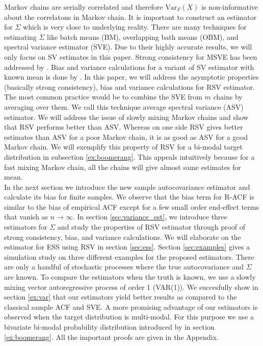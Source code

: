 \documentclass[12pt]{article}
\newcommand{\Var}{\text{Var}}
\begin{document}
Markov chains are serially correlated and therefore $\Var_F(X)$ is non-informative about the correlatons in Markov chain. It is important to construct an estimator for $\Sigma$ which is very close to underlying reality. There are many techniques for estimating $\Sigma$ like batch means (BM), overlapping bath means (OBM), and spectral variance estimator (SVE). Due to their highly accurate results, we will only focus on SV estimates in this paper. Strong consistency for MSVE has been addressed by \cite{vats:fleg:jon:2018}. Bias and variance calculations for a variant of SV estimator with known mean is done by \cite{hannan2009multiple}. In this paper, we will address the asymptotic properties (basically strong consistency), bias and variance calculations for RSV estimator. \\

The most common practice would be to combine the SVE from $m$ chains by averaging over them. We call this technique average spectral variance (ASV) estimator. We will address the issue of slowly mixing Markov chains and show that RSV performs better than ASV. Whereas on one side RSV gives better estimates than ASV for a poor Markov chain, it is as good as ASV for a good Markov chain. We will exemplify this property of RSV for a bi-modal target distribution in subsection \ref{ex:boomerang}. This appeals intuitively because for a fast mixing Markov chain, all the chains will give almost same estimates for mean. \\

In the next section we introduce the new sample autocovariance estimator and calculate its bias for finite samples. We observe that the bias term for R-ACF is similar to the bias of empirical ACF except for a few small order end-effect terms that vanish as $n \to \infty$. In section \ref{sec:variance_est}, we introduce three estimators for $\Sigma$ and study the properties of RSV estimator through proof of strong consistency, bias, and variance calculations. We will elaborate on the estimator for ESS using RSV in section \ref{sec:ess}. Section \ref{sec:examples} gives a simulation study on three different examples for the proposed estimators. There are only a handful of stochastic processes where the true autocovariance and $\Sigma$ are known. To compare the estimators when the truth is known, we use a slowly mixing vector autoregressive process of order 1 (VAR(1)). We succesfully show in section \ref{ex:var} that our estimators yield better results as compared to the classical sample ACF and SVE. A more promising advantage of our estimators is observed when the target distribution is multi-modal. For this purpose we use a bivariate bi-modal probability distribution introduced by \cite{gelman1991note} in section \ref{ex:boomerang}. All the important proofs are given in the Appendix. 
\end{document}
